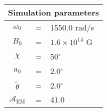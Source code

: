 \begin{tabular}{ccl}
\multicolumn{3}{c}{Simulation parameters} \\
\hline
$\omega_0$  &=& 1550.0 rad/s\\
$B_0$  &=& ${1.6}\times 10^{14}$ G \\
$\chi$  &=& 50$^{\circ}$ \\
$a_0$ &=& 2.0$^{\circ}$ \\
$\tilde{\theta}$ &= & 2.0$^{\circ}$ \\
$\mathcal{A}_{\mathrm{EM}}$ &= & $41.0$
\end{tabular}
